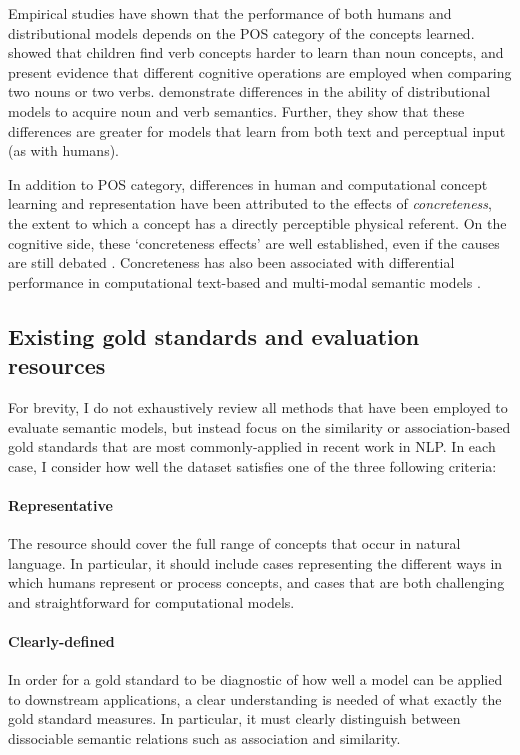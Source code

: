 Empirical studies have shown that the performance of both humans and distributional models depends on the POS category of the concepts learned. \cite{gentner2006verbs} showed that children find verb concepts harder to learn than noun concepts, and \cite{markman1997similar} present evidence that different cognitive operations are employed when comparing two nouns or two verbs. \cite{hill2014multi} demonstrate differences in the ability of distributional models to acquire noun and verb semantics. Further, they show that these differences are greater for models that learn from both text and perceptual input (as with humans).

In addition to POS category, differences in human and computational concept learning and representation have been attributed to the effects of \emph{concreteness}, the extent to which a concept has a directly perceptible physical referent. On the cognitive side, these `concreteness effects' are well established, even if the causes are still debated \cite{paivio1991dual,hill2013quantitative}. Concreteness has also been associated with differential performance in computational text-based \cite{hill2013concreteness} and multi-modal semantic models \cite{kielaimproving}.

\subsection{Existing gold standards and evaluation resources}
\label{existing}

For brevity, I do not exhaustively review all methods that have been employed to evaluate semantic models, but instead focus on the similarity or association-based gold standards that are most commonly-applied in recent work in NLP. In each case, I consider how well the dataset satisfies one of the three following criteria:  

\paragraph{Representative} The resource should cover the full range of concepts that occur in natural language. In particular, it should include cases representing the different ways in which humans represent or process concepts, and cases that are both challenging and straightforward for computational models. 

\paragraph{Clearly-defined} In order for a gold standard to be diagnostic of how well a model can be applied to downstream applications, a clear understanding is needed of what exactly the gold standard measures. In particular, it must clearly distinguish between dissociable semantic relations such as association and similarity.

